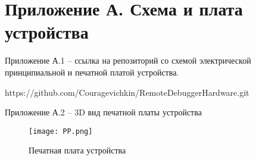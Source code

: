 \chapter*{Приложение А. Схема и плата устройства}
\hspace{1cm} 

Приложение А.1 -- ссылка на репозиторий со схемой электрической принципиальной и печатной платой 
устройства.

https://github.com/Couragevichkin/RemoteDebuggerHardware.git


Приложение А.2 -- 3D вид печатной платы устройства

\begin{figure}[H]
    \centering
    \texttt{[image: PP.png]}
    \caption{Печатная плата устройства}
  \end{figure}